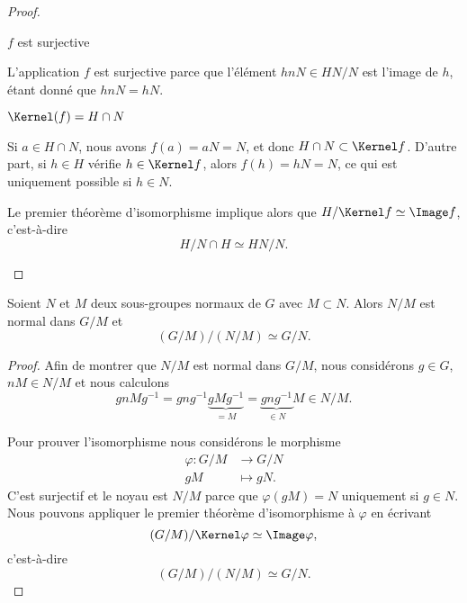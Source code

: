 \begin{proof}
\begin{enumerate}
            \begin{subproof}
                \item[\( f\) est surjective]

                    L'application \( f\) est surjective parce que l'élément \( hnN\in HN/N\) est l'image de \( h\), étant donné que \( hnN=hN\).

                \item[\( \Kernel(f)=H\cap N\)]

            Si \( a\in H\cap N\), nous avons \( f(a) =aN = N\), et donc \( H\cap N\subset \Kernel f\). D'autre part, si \( h\in H\) vérifie \( h\in\Kernel f\), alors \( f(h)=hN=N\), ce qui est uniquement possible si \( h\in N\).

            \end{subproof}
            Le premier théorème d'isomorphisme implique alors que \( H/\Kernel f\simeq \Image f\), c'est-à-dire
            \begin{equation}
                H/N\cap H\simeq HN/N.
            \end{equation}
    \end{enumerate}
\end{proof}

\begin{theorem}  \label{ThoezgBep}
    Soient \( N\) et \( M\) deux sous-groupes normaux de \( G\) avec \( M\subset N\). Alors \( N/M\) est normal dans \( G/M\) et
    \begin{equation}
        (G/M)/(N/M)\simeq G/N.
    \end{equation}
\end{theorem}

\begin{proof}
    Afin de montrer que \( N/M\) est normal dans \( G/M\), nous considérons \( g\in G\), \( nM\in N/M\) et nous calculons
    \begin{equation}
        gnMg^{-1}=gng^{-1}\underbrace{gMg^{-1}}_{=M}=\underbrace{gng^{-1}}_{\in N}M\in N/M.
    \end{equation}

    Pour prouver l'isomorphisme nous considérons le morphisme
    \begin{equation}
        \begin{aligned}
            \varphi\colon G/M&\to G/N \\
            gM&\mapsto gN.
        \end{aligned}
    \end{equation}
    C'est surjectif et le noyau est \( N/M\) parce que \( \varphi(gM)=N\) uniquement si \( g\in N\). Nous pouvons appliquer le premier théorème d'isomorphisme à \( \varphi\) en écrivant
    \begin{equation}
        (G/M)/\Kernel \varphi\simeq\Image \varphi,
    \end{equation}
    c'est-à-dire
    \begin{equation}
        (G/M)/(N/M)\simeq G/N.
    \end{equation}
\end{proof}

